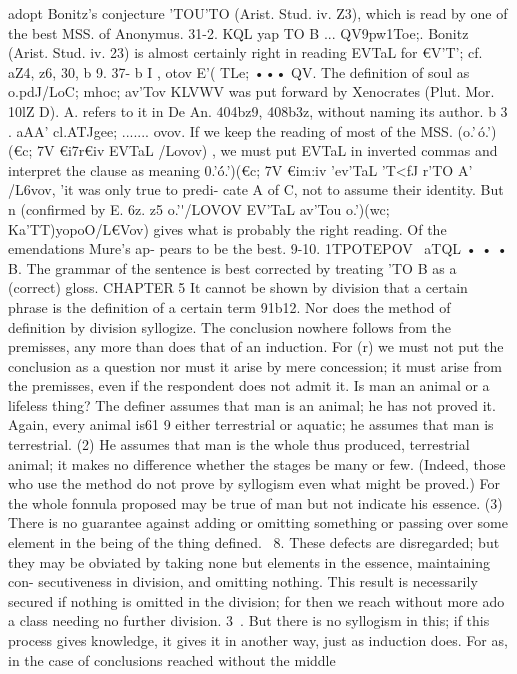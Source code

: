 {{{{{{{{{{{{{{{{{{{{{{{{{adopt Bonitz's conjecture 'TOU'TO (Arist. Stud. iv. Z3), which is
read by one of the best MSS. of Anonymus.
31-2. KQL yap TO B ... QV9pw1Toe;. Bonitz (Arist. Stud. iv. 23)
is almost certainly right in reading EVTaL for €V'T'; cf. aZ4, z6, 30, b 9.
37- b I , otov E'( TLe; ••• QV. The definition of soul as o.pdJ/LoC;
mhoc; av'Tov KLVWV was put forward by Xenocrates (Plut. Mor.
10lZ D). A. refers to it in De An. 404bz9, 408b3z, without naming
its author.
b 3 . aAA' cl.ATJgee; ....... ovov. If we keep the reading of most of
the MSS. (o.'\,\' o.'\T)(}€c; 7}V €i7r€iv EVTaL /Lovov) , we must put EVTaL
in inverted commas and interpret the clause as meaning 0.'\'\'
o.'\T)(}€c; 7}V €im:iv 'ev'TaL 'T<fJ r'TO A' /L6vov, 'it was only true to predi-
cate A of C, not to assume their identity. But n (confirmed by
E. 6z. z5 o.'\'\a /LOVOV EV'TaL av'Tou o.'\T)(}wc; Ka'TT)yopoO/L€Vov) gives what
is probably the right reading. Of the emendations Mure's ap-
pears to be the best.
9-10. 1TPOTEPOV ~aTQL • • • B. The grammar of the sentence
is best corrected by treating 'TO B as a (correct) gloss.
CHAPTER 5
It cannot be shown by division that a certain phrase is the
definition of a certain term
91b12. Nor does the method of definition by division syllogize.
The conclusion nowhere follows from the premisses, any more than
does that of an induction. For (r) we must not put the conclusion
as a question nor must it arise by mere concession; it must arise
from the premisses, even if the respondent does not admit it.
Is man an animal or a lifeless thing? The definer assumes that
man is an animal; he has not proved it. Again, every animal is61 9
either terrestrial or aquatic; he assumes that man is terrestrial.
(2) He assumes that man is the whole thus produced, terrestrial
animal; it makes no difference whether the stages be many or
few. (Indeed, those who use the method do not prove by
syllogism even what might be proved.) For the whole fonnula
proposed may be true of man but not indicate his essence. (3)
There is no guarantee against adding or omitting something or
passing over some element in the being of the thing defined.
~8. These defects are disregarded; but they may be obviated
by taking none but elements in the essence, maintaining con-
secutiveness in division, and omitting nothing. This result is
necessarily secured if nothing is omitted in the division; for then
we reach without more ado a class needing no further division.
3~. But there is no syllogism in this; if this process gives
knowledge, it gives it in another way, just as induction does.
For as, in the case of conclusions reached without the middle
}}}}}}}}}}}}}}}}}}}}

